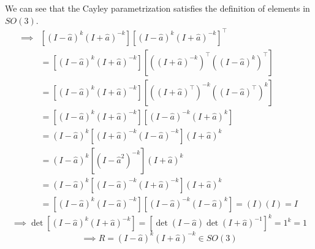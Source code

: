 We can see that the Cayley parametrization satisfies the definition of elements in \( SO(3) \).
\begin{align*}
    \implies
     &
    \left[
        {(I - \widehat{a})}^{k}
            {(I + \widehat{a})}^{-k}
        \right]
    {\left[
            {(I - \widehat{a})}^{k}
                {(I + \widehat{a})}^{-k}
            \right]}^{\top}
    \\ & =
    \left[
        {(I - \widehat{a})}^{k}
            {(I + \widehat{a})}^{-k}
        \right]
    \left[
        {\left({(I + \widehat{a})}^{-k}\right)}^{\top}
            {\left({(I - \widehat{a})}^{k}\right)}^{\top}
        \right]
    \\ & =
    \left[
        {(I - \widehat{a})}^{k}
            {(I + \widehat{a})}^{-k}
        \right]
    \left[
        {\left({(I + \widehat{a})}^{\top}\right)}^{-k}
            {\left({(I - \widehat{a})}^{\top}\right)}^{k}
        \right]
    \\ & =
    \left[
        {(I - \widehat{a})}^{k}
            {(I + \widehat{a})}^{-k}
        \right]
    \left[
        {(I - \widehat{a})}^{-k}
            {(I + \widehat{a})}^{k}
        \right]
    \\ & =
    {(I - \widehat{a})}^{k}
    \left[
        {(I + \widehat{a})}^{-k}
            {(I - \widehat{a})}^{-k}
        \right]
    {(I + \widehat{a})}^{k}
    \\ & =
    {(I - \widehat{a})}^{k}
    \left[
        {(I - \widehat{a}^{2})}^{-k}
        \right]
    {(I + \widehat{a})}^{k}
    \\ & =
    {(I - \widehat{a})}^{k}
    \left[
        {(I - \widehat{a})}^{-k}
            {(I + \widehat{a})}^{-k}
        \right]
    {(I + \widehat{a})}^{k}
    \\ & =
    \left[
        {(I - \widehat{a})}^{k} {(I - \widehat{a})}^{-k}
        \right]
    \left[
        {(I - \widehat{a})}^{-k} {(I - \widehat{a})}^{k}
        \right]
    =
    (I)(I)
    =
    I
\end{align*}
\begin{equation*}
    \implies
    \det
    \left[
        {(I - \widehat{a})}^{k}
            {(I + \widehat{a})}^{-k}
        \right]
    =
    {\left[
        \det (I - \widehat{a})
        {\det (I + \widehat{a})}^{-1}
        \right]}^{k}
    =
    1^{k}
    =
    1
\end{equation*}
\begin{equation}
    \implies
    R = {(I - \widehat{a})}^{k} {(I + \widehat{a})}^{-k} \in SO(3)
\end{equation}

